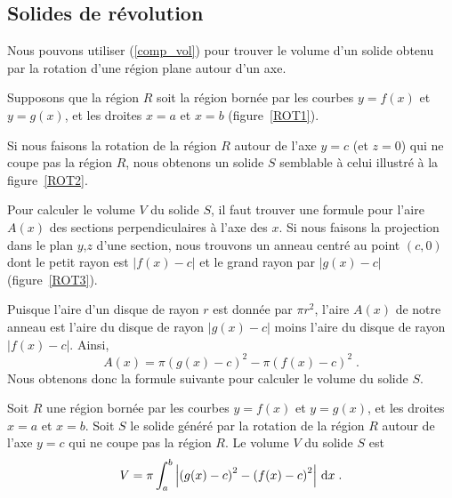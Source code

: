 {\subsection{Solides de révolution}

Nous pouvons utiliser (\ref{comp_vol}) pour trouver le volume d'un solide obtenu
par la rotation d'une région plane autour d'un axe.


Supposons que la région $R$ soit la région bornée par les courbes $y=f(x)$ et
$y=g(x)$, et les droites $x=a$ et $x=b$ (figure~\ref{ROT1}).


Si nous faisons la rotation de la région $R$ autour de l'axe $y=c$ (et
$z=0$) qui ne coupe pas la région $R$, nous obtenons un solide $S$
semblable à celui illustré à la figure~\ref{ROT2}.


Pour calculer le volume $V$ du solide $S$, il faut trouver une formule pour
l'aire $A(x)$ des sections perpendiculaires à l'axe des $x$.  Si nous
faisons la projection dans le plan $y$,$z$ d'une section, nous trouvons un
anneau centré au point $(c,0)$ dont le petit rayon est $|f(x)-c|$ et
le grand rayon par $|g(x)-c|$ (figure~\ref{ROT3}).

Puisque l'aire d'un disque de rayon $r$ est donnée par $\pi r^2$,
l'aire $A(x)$ de notre anneau est l'aire du disque de rayon $|g(x)-c|$
moins l'aire du disque de rayon $|f(x)-c|$.  Ainsi,
\[
A(x) = \pi\left(g(x)-c\right)^2 - \pi\left(f(x)-c\right)^2 \; .
\]
Nous obtenons donc la formule suivante pour calculer le volume du solide $S$.

\begin{focus}{\mth}
Soit $R$ une région bornée par les courbes $y=f(x)$ et $y=g(x)$, et les
droites $x=a$ et $x=b$.  Soit $S$ le solide généré par la rotation de la
région $R$ autour de l'axe $y=c$ qui ne coupe pas la région $R$.  Le volume
$V$ du solide $S$ est
\begin{equation}\label{vol_washer}
V = \pi \int_a^b \left|\left(g(x)-c\right)^2 -
  \left(f(x)-c\right)^2\right| \,\mathrm{d}x \; .
\end{equation}
\end{focus}

}
